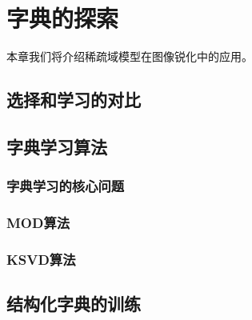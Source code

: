 \chapter{字典的探索}\label{chap:sra:sharpen}


本章我们将介绍稀疏域模型在图像锐化中的应用。


\section{选择和学习的对比}



\section{字典学习算法}


\subsection{字典学习的核心问题}

\subsection{MOD算法}


\subsection{KSVD算法}



\section{结构化字典的训练}